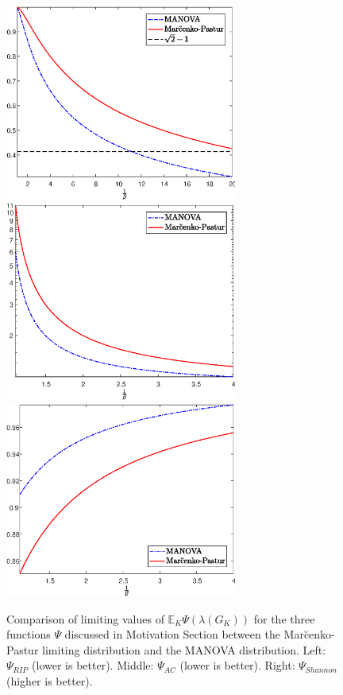 \documentclass[a4paper,12pt]{article}
\newcommand{\E}{\ensuremath{\mathbb{E}}}
\newcommand{\specstat}{\ensuremath{\Psi}}
\begin{document}
\begin{figure}[h!]
\centering
\includegraphics[width=3in]{RIPLimit_gamma0_5_2_pnas.eps}\\
\includegraphics[width=3in]{ACLimit_gamma0_5_2_pnas.eps}\\
\includegraphics[width=3in]{ShannonLimit_gamma0_5_2_pnas.eps}
\caption{Comparison of limiting values of $\E_K \specstat(\lambda(G_K))$ for the three
functions $\specstat$ discussed in Motivation Section between the Mar\u cenko-Pastur limiting distribution and the MANOVA
distribution. Left: $\specstat_{RIP}$ (lower is better). 
Middle: $\specstat_{AC}$ (lower is
better). Right: $\specstat_{Shannon}$ (higher is better).
%
}
\label{fig:limiting_F}
\end{figure}
\end{document}
